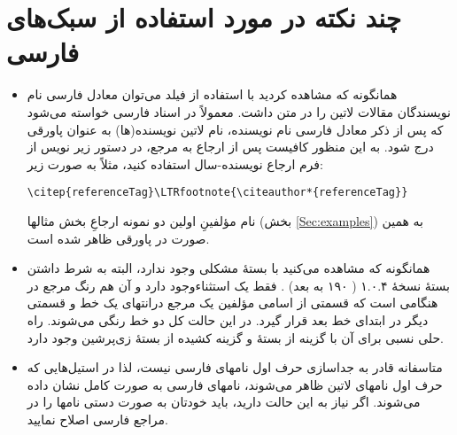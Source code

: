 \documentclass[a4paper]{article}
\theoremstyle{plain}\newtheorem{question}{پرسش}
\begin{document}
\section{چند نکته در مورد استفاده از سبک‌های فارسی}
\begin{itemize}
\item همانگونه که مشاهده کردید با استفاده از فیلد  می‌توان معادل فارسی نام نویسندگان مقالات لاتین را در متن داشت. معمولاً در اسناد فارسی خواسته می‌شود که پس از ذکر معادل فارسی نام نویسنده، نام لاتین نویسنده(ها) به عنوان پاورقی درج شود. به این منظور کافیست پس از ارجاع به مرجع، در دستور زیر نویس از فرم ارجاع نویسنده-سال  استفاده کنید، مثلاً به صورت زیر:
\begin{latin}
\begin{verbatim}
\citep{referenceTag}\LTRfootnote{\citeauthor*{referenceTag}}
\end{verbatim}
\end{latin}
  نام مؤلفینِ اولین دو نمونه ارجاعِ بخش مثالها (بخش \ref{Sec:examples}) به همین‌ صورت در پاورقی ظاهر شده است.
 
\item همانگونه که مشاهده می‌کنید با بستهٔ  مشکلی وجود ندارد، البته به شرط داشتن بستهٔ نسخهٔ ۱.۰.۴ ( ۱۹۰ به بعد) . فقط یک استثناءوجود دارد و آن هم رنگ مرجع در هنگامی است که  قسمتی از اسامی مؤلفین یک مرجع درانتهای یک خط و قسمتی دیگر در ابتدای خط بعد قرار گیرد. در این حالت کل دو خط رنگی می‌شوند.  راه حلی نسبی برای آن با  گزینه   از بستهٔ  و گزینه  کشیده  از بستهٔ زی‌پرشین وجود دارد. 


\item متاسفانه  قادر به جداسازی حرف اول نامهای فارسی نیست، لذا در استیل‌‌هایی که حرف اول نامهای لاتین ظاهر می‌شوند، نامهای فارسی به صورت کامل نشان داده می‌شوند. اگر نیاز به این حالت دارید، باید خودتان به صورت دستی نامها را در مراجع فارسی اصلاح نمایید.


\end{itemize}
\end{document}
